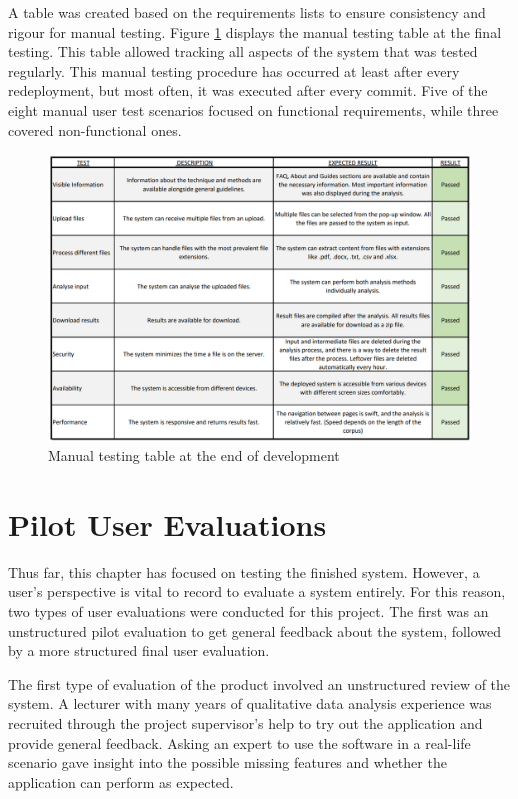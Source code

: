 \documentclass{l4proj}
\begin{document}
A table was created based on the requirements lists to ensure consistency and rigour for manual testing. Figure \ref{fig:manual_testing} displays the manual testing table at the final testing. This table allowed tracking all aspects of the system that was tested regularly. This manual testing procedure has occurred at least after every redeployment, but most often, it was executed after every commit. Five of the eight manual user test scenarios focused on functional requirements, while three covered non-functional ones. 
\begin{figure}
    \centering
    \includegraphics[width=1\linewidth]{images/manual_testing_table.png}
    \caption{Manual testing table at the end of development}
    \label{fig:manual_testing} 
\end{figure}


\section{Pilot User Evaluations}
Thus far, this chapter has focused on testing the finished system. However, a user's perspective is vital to record to evaluate a system entirely. For this reason, two types of user evaluations were conducted for this project. The first was an unstructured pilot evaluation to get general feedback about the system, followed by a more structured final user evaluation. 

The first type of evaluation of the product involved an unstructured review of the system. A lecturer with many years of qualitative data analysis experience was recruited through the project supervisor's help to try out the application and provide general feedback. Asking an expert to use the software in a real-life scenario gave insight into the possible missing features and whether the application can perform as expected.
\end{document}
